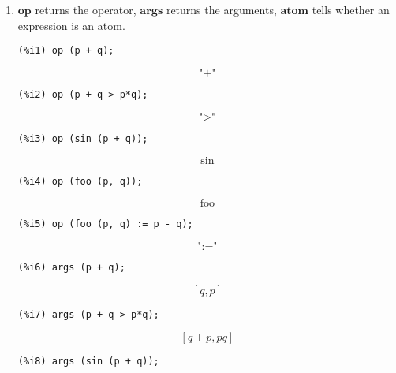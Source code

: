 \documentclass[12pt,leqno]{article}
\begin{document}
\begin{enumerate}
\item $\mathbf{op}$ returns the operator, $\mathbf{args}$ returns the arguments,
$\mathbf{atom}$ tells whether an expression is an atom.
\begin{verbatim}
(%i1) op (p + q);
\end{verbatim}
\begin{dmath}[number={\(\mathop{\mathrm{\%o}_{1}}\)}]
\mbox{"+"}
\end{dmath}
\begin{verbatim}
(%i2) op (p + q > p*q);
\end{verbatim}
\begin{dmath}[number={\(\mathop{\mathrm{\%o}_{2}}\)}]
\mbox{"\textgreater "}
\end{dmath}
\begin{verbatim}
(%i3) op (sin (p + q));
\end{verbatim}
\begin{dmath}[number={\(\mathop{\mathrm{\%o}_{3}}\)}]
\sin
\end{dmath}
\begin{verbatim}
(%i4) op (foo (p, q));
\end{verbatim}
\begin{dmath}[number={\(\mathop{\mathrm{\%o}_{4}}\)}]
\mathop{\mathrm{foo}}
\end{dmath}
\begin{verbatim}
(%i5) op (foo (p, q) := p - q);
\end{verbatim}
\begin{dmath}[number={\(\mathop{\mathrm{\%o}_{5}}\)}]
\mbox{":="}
\end{dmath}
\begin{verbatim}
(%i6) args (p + q);
\end{verbatim}
\begin{dmath}[number={\(\mathop{\mathrm{\%o}_{6}}\)}]
\left[q, p\right]
\end{dmath}
\begin{verbatim}
(%i7) args (p + q > p*q);
\end{verbatim}
\begin{dmath}[number={\(\mathop{\mathrm{\%o}_{7}}\)}]
\left[q+p, p q\right]
\end{dmath}
\begin{verbatim}
(%i8) args (sin (p + q));
\end{verbatim}
\begin{dmath}[number={\(\mathop{\mathrm{\%o}_{8}}\)}]

\end{dmath}
\end{enumerate}
\end{document}
